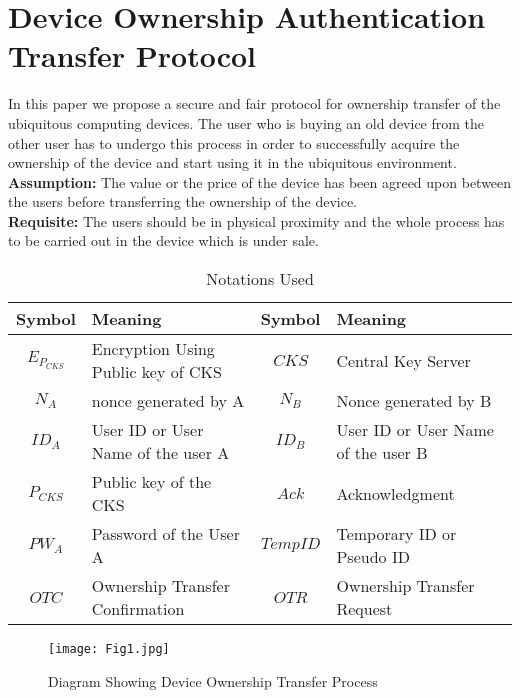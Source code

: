 \documentclass[letterpaper]{article}
\begin{document}
\section{Device Ownership Authentication Transfer Protocol}
\label{a}
In this paper we propose a secure and fair protocol for ownership transfer of the ubiquitous computing devices. The user who is buying an old device from the other user has to undergo this process in order to successfully acquire the ownership of the device and start using it in the ubiquitous environment.\\

\textbf{Assumption:} The value or the price of the device has been agreed upon between the users before transferring the ownership of the device.\\

\textbf{Requisite:} The users should be in physical proximity and the whole process has to be carried out in the device which is under sale.

\begin{table*}[bpht!]
\centering
	\caption{Notations Used} 
	\label{tab}
\begin{tabular}{|c|p{2in}|c|p{1.5in}|}
	\hline 
	\textbf{Symbol}&\textbf{Meaning}&\textbf{Symbol}&\textbf{Meaning} \\ \hline 
	
	$E_{P_{CKS}}$&Encryption Using Public key of CKS&$CKS$&Central Key Server\\ \hline 
			$N_A$&nonce generated by A& $N_B$&Nonce generated by B \\ \hline
			$ID_A$&User ID or User Name of the user A&$ID_B$&User ID or User Name of the user B\\ \hline 
			$P_{CKS}$&Public key of the CKS&$Ack$& Acknowledgment\\ \hline
			$PW_A$&Password of the User A&$Temp ID$& Temporary ID or Pseudo ID\\ \hline 
			$OTC$&Ownership Transfer Confirmation&$OTR$&Ownership Transfer Request\\ \hline
		  
	\end{tabular}
\end{table*}	 
 
\begin{figure}[bpht!]
\centering
\texttt{[image: Fig1.jpg]}
\caption{Diagram Showing Device Ownership Transfer Process}
\label{fig:1}
\end{figure}
\end{document}
